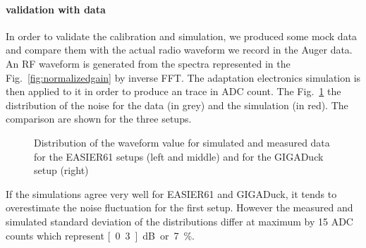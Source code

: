 \paragraph{validation with data}
In order to  validate the calibration and simulation,  we produced some mock data   
and compare them with the  actual radio waveform  we record in  the Auger data.   An RF waveform   is  generated   from   the  spectra   represented  in   the Fig.~\ref{fig:normalizedgain}   by  inverse  FFT.    The  adaptation electronics simulation  is then applied to  it in order  to produce an trace    in   ADC    count.     The Fig.~\ref{fig:distcomparison} the distribution  of the noise for the
data (in grey)  and the simulation (in red).  The comparison are shown
for the three setups.
\begin{figure}[!ht]
 \centering
 \hspace*{-3ex}
 \caption{Distribution of the waveform value for simulated and measured data for the EASIER61 setups (left and middle) and for the GIGADuck setup (right)}
 \label{fig:distcomparison}
\end{figure}
If the simulations agree very well for EASIER61 and GIGADuck, it tends
to overestimate the noise fluctuation for the first setup. However the
measured and simulated standard  deviation of the distributions differ
 at maximum by 15 ADC counts which represent \unit[0.3]{dB} or 7\%.

